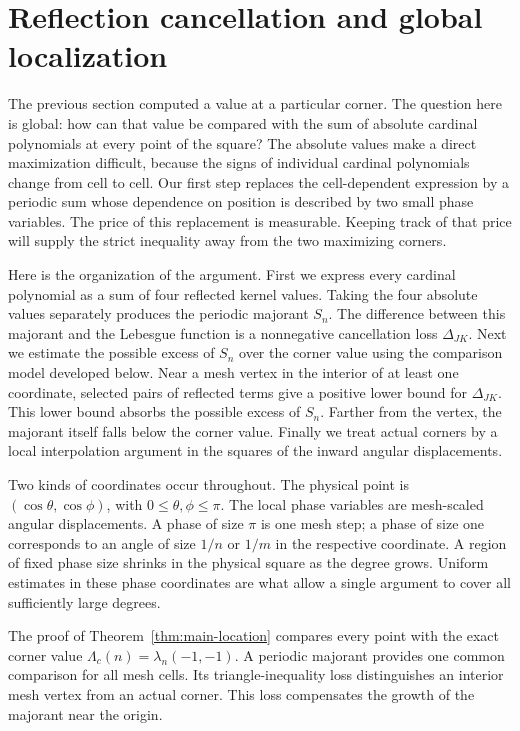 \section{Reflection cancellation and global localization}
\label{sec:argmax}

The previous section computed a value at a particular corner.  The
question here is global: how can that value be compared with the sum of
absolute cardinal polynomials at every point of the square?  The
absolute values make a direct maximization difficult, because the signs
of individual cardinal polynomials change from cell to cell.  Our first
step replaces the cell-dependent expression by a periodic sum whose
dependence on position is described by two small phase variables.  The
price of this replacement is measurable.  Keeping track of that price
will supply the strict inequality away from the two maximizing corners.

Here is the organization of the argument.  First we express every
cardinal polynomial as a sum of four reflected kernel values.  Taking
the four absolute values separately produces the periodic majorant
$S_n$.  The difference between this majorant and the Lebesgue function
is a nonnegative cancellation loss $\Delta_{JK}$.  Next we estimate the
possible excess of $S_n$ over the corner value using the comparison
model developed below.  Near a mesh vertex in the interior of at least
one coordinate, selected pairs of reflected terms give a positive lower
bound for $\Delta_{JK}$.  This lower bound absorbs the possible excess
of $S_n$.  Farther from the vertex, the majorant itself falls below the
corner value.  Finally we treat actual corners by a local interpolation
argument in the squares of the inward angular displacements.

Two kinds of coordinates occur throughout.  The physical point is
$(\cos\theta,\cos\phi)$, with $0\leq\theta,\phi\leq\pi$.
The local phase variables are mesh-scaled angular displacements.  A
phase of size $\pi$ is one mesh step; a phase of size one corresponds
to an angle of size $1/n$ or $1/m$ in the respective coordinate.
A region of fixed phase
size shrinks in the physical square as the degree grows.  Uniform
estimates in these phase coordinates are what allow a single argument
to cover all sufficiently large degrees.

The proof of Theorem~\ref{thm:main-location} compares every point with
the exact corner value $\Lambda_c(n)=\lambda_n(-1,-1)$.  A periodic
majorant provides one common comparison for all mesh cells.  Its
triangle-inequality loss distinguishes an interior mesh vertex from an
actual corner.  This loss compensates the growth of the majorant near the origin.


